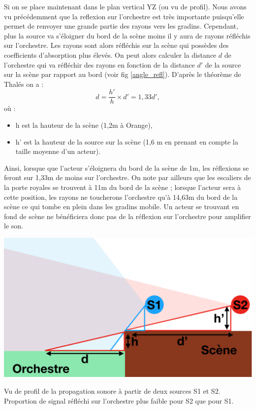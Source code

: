 Si on se place maintenant dans le plan vertical YZ (ou vu de profil). Nous avons vu précédemment que la reflexion sur l'orchestre est très importante puisqu'elle permet de renvoyer une grande partie des rayons vers les gradins. Cependant, plus la source va s'éloigner du bord de la scène moins il y aura de rayons réfléchis sur l'orchestre. Les rayons sont alors réfléchis sur la scène qui possèdes des coefficients d'absorption plus élevés. On peut alors calculer la distance $d$ de l'orchestre qui va réfléchir des rayons en fonction de la distance $d'$ de la source sur la scène par rapport au bord (voir fig \ref{angle_refl}). D'après le théorème de Thalés on a :
\begin{equation}
d = \frac{h'}{h}\times d' = 1,33d',
\end{equation}
où :
\begin{itemize}
\item h est la hauteur de la scène (1,2m à Orange),
\item h' est la hauteur de la source sur la scène (1,6 m en prenant en compte la taille moyenne d'un acteur).
\end{itemize}
Ainsi, lorsque que l'acteur s'éloignera du bord de la scène de 1m, les réflexions se feront sur 1,33m de moins sur l'orchestre. On note par ailleurs que les escaliers de la porte royales se trouvent à 11m du bord de la scène ; lorsque l'acteur sera à cette position, les rayons ne toucherons l'orchestre qu'à 14,63m du bord de la scène ce qui tombe en plein dans les gradins mobile. Un acteur se trouvant en fond de scène ne bénéficiera donc pas de la réflexion sur l'orchestre pour amplifier le son.
\begin{figureth}
	\includegraphics[width=0.8\linewidth]{images/angle_refl}
	\caption{Vu de profil de la propagation sonore à partir de deux sources S1 et S2. Proportion de signal réfléchi sur l'orchestre plus faible pour S2 que pour S1.}
	\label{angle_refl}
\end{figureth}


